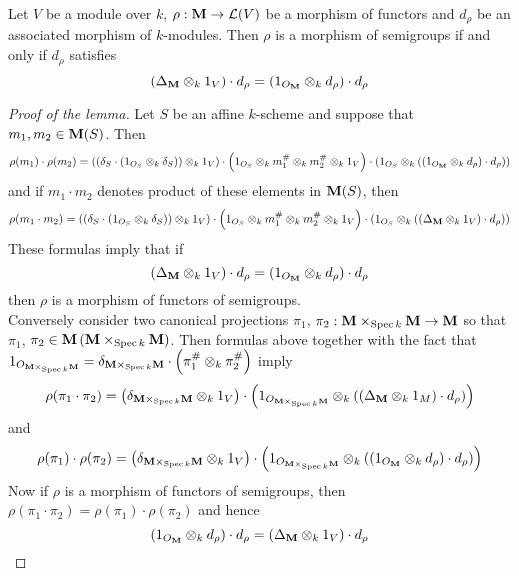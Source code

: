 \begin{lemma}\label{semigroupmorphism}
Let $V$ be a module over $k$, $\rho:\mathbf{M}\rightarrow {\mathcal L}(V)$ be a morphism of functors and $d_{\rho}$ be an associated morphism of $k$-modules. Then $\rho$ is a morphism of semigroups if and only if $d_{\rho}$ satisfies 
$$\left(\Delta_{\mathbf{M}}\otimes_{k}1_V\right)\cdot d_{\rho}=\left(1_{O_{\mathbf{M}}}\otimes_{k}d_{\rho}\right)\cdot d_{\rho}$$
\end{lemma}
\begin{proof}[Proof of the lemma]
Let $S$ be an affine $k$-scheme and suppose that $m_1,m_2\in \mathbf{M}(S)$. Then
$$\rho(m_1)\cdot \rho(m_2)=\left(\left(\delta_S\cdot \left(1_{O_S}\otimes_{k}\delta_S\right)\right)\otimes_{k}1_V\right)\cdot \left(1_{O_S}\otimes_{k}m_1^{\#}\otimes_{k}m_2^{\#}\otimes_{k}1_V\right)\cdot \left(1_{O_S}\otimes_{k}\left(\left(1_{O_{\mathbf{M}}}\otimes_{k}d_{\rho}\right)\cdot d_{\rho}\right)\right)$$
and if $m_1\cdot m_2$ denotes product of these elements in $\mathbf{M}(S)$, then
$$\rho(m_1\cdot m_2)=\left(\left(\delta_S\cdot \left(1_{O_S}\otimes_{k}\delta_S\right)\right)\otimes_{k}1_V\right)\cdot \left(1_{O_S}\otimes_{k}m_1^{\#}\otimes_{k}m_2^{\#}\otimes_{k}1_V\right)\cdot\left(1_{O_S}\otimes_{k}\left(\left(\Delta_{\mathbf{M}}\otimes_{k}1_V\right)\cdot d_{\rho}\right)\right)$$
These formulas imply that if 
$$\left(\Delta_{\mathbf{M}}\otimes_{k}1_V\right)\cdot d_{\rho}=\left(1_{O_{\mathbf{M}}}\otimes_{k}d_{\rho}\right)\cdot d_{\rho}$$
then $\rho$ is a morphism of functors of semigroups.\\
Conversely consider two canonical projections $\pi_1$, $\pi_2:\mathbf{M}\times_{\mathrm{Spec}\, k}\mathbf{M}\rightarrow \mathbf{M}$ so that $\pi_1$, $\pi_2\in \mathbf{M}\left(\mathbf{M}\times_{\mathrm{Spec}\, k}\mathbf{M}\right)$. Then formulas above together with the fact that $1_{O_{\mathbf{M}\times_{\mathrm{Spec}\, k}\mathbf{M}}}= \delta_{\mathbf{M}\times_{\mathrm{Spec}\, k}\mathbf{M}}\cdot \left(\pi_1^{\#}\otimes_{k}\pi_2^{\#}\right)$ imply
$$\rho(\pi_1\cdot \pi_2)=\left(\delta_{\mathbf{M}\times_{\mathrm{Spec}\, k}\mathbf{M}}\otimes_{k}1_V\right)\cdot \left(1_{O_{\mathbf{M}\times_{\mathrm{Spec}\, k}\mathbf{M}}}\otimes_{k}\left(\left(\Delta_{\mathbf{M}}\otimes_{k}1_M\right)\cdot d_{\rho}\right)\right)$$
and
$$\rho(\pi_1)\cdot \rho(\pi_2)=\left(\delta_{\mathbf{M}\times_{\mathrm{Spec}\, k}\mathbf{M}}\otimes_{k}1_V\right)\cdot \left(1_{O_{\mathbf{M}\times_{\mathrm{Spec}\, k}\mathbf{M}}}\otimes_{k}\left(\left(1_{O_{\mathbf{M}}}\otimes_{k}d_{\rho}\right)\cdot d_{\rho}\right)\right)$$
Now if $\rho$ is a morphism of functors of semigroups, then $\rho(\pi_1\cdot \pi_2)=\rho(\pi_1)\cdot \rho(\pi_2)$ and hence
$$\left(1_{O_{\mathbf{M}}}\otimes_{k}d_{\rho}\right)\cdot d_{\rho}=\left(\Delta_{\mathbf{M}}\otimes_{k}1_V\right)\cdot d_{\rho}$$
\end{proof}

